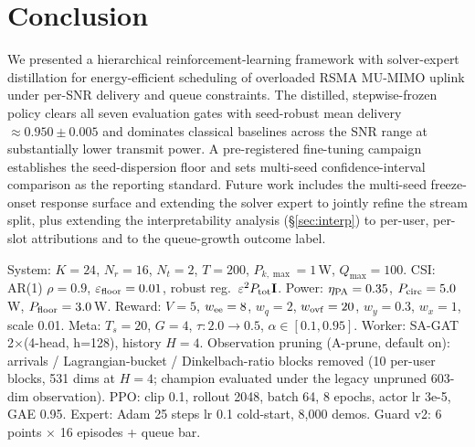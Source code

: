 \documentclass[journal]{IEEEtran}
\newcommand{\vect}[1]{\mathbf{#1}}
\begin{document}
\section{Conclusion}
\label{sec:conclusion}

We presented a hierarchical reinforcement-learning framework with solver-expert
distillation for energy-efficient scheduling of overloaded RSMA MU-MIMO uplink
under per-SNR delivery and queue constraints. The distilled, stepwise-frozen
policy clears all seven evaluation gates with seed-robust mean delivery
$\approx0.950\pm0.005$ and dominates classical baselines across the SNR range at
substantially lower transmit power. A pre-registered fine-tuning campaign
establishes the seed-dispersion floor and sets multi-seed confidence-interval
comparison as the reporting standard. Future work includes the multi-seed
freeze-onset response surface and extending the solver expert to jointly refine
the stream split, plus extending the interpretability analysis
(\S\ref{sec:interp}) to per-user, per-slot attributions and to the queue-growth
outcome label.

\label{app:hparams}
System: $K=24$, $N_r=16$, $N_t=2$, $T=200$, $P_{k,\max}=1$\,W, $Q_{\max}=100$.
CSI: AR(1) $\rho=0.9$, $\varepsilon_{\rm floor}=0.01$, robust reg.\
$\varepsilon^2 P_{\rm tot}\vect{I}$. Power: $\eta_{\rm PA}=0.35$,
$P_{\rm circ}=5.0$\,W, $P_{\rm floor}=3.0$\,W. Reward: $V=5$, $w_{\rm ee}=8$,
$w_q=2$, $w_{\rm ovf}=20$, $w_y=0.3$, $w_x=1$, scale 0.01. Meta: $T_s=20$, $G=4$,
$\tau:2.0\to0.5$, $\alpha\in[0.1,0.95]$. Worker: SA-GAT 2$\times$(4-head, h=128),
history $H=4$. Observation pruning (A-prune, default on): arrivals /
Lagrangian-bucket / Dinkelbach-ratio blocks removed (10 per-user blocks,
531 dims at $H{=}4$; champion evaluated under the legacy unpruned 603-dim
observation). PPO: clip 0.1, rollout 2048, batch 64, 8 epochs, actor lr 3e-5,
GAE 0.95. Expert: Adam 25 steps lr 0.1 cold-start, 8{,}000 demos. Guard v2:
6 points $\times$ 16 episodes + queue bar.
\end{document}
